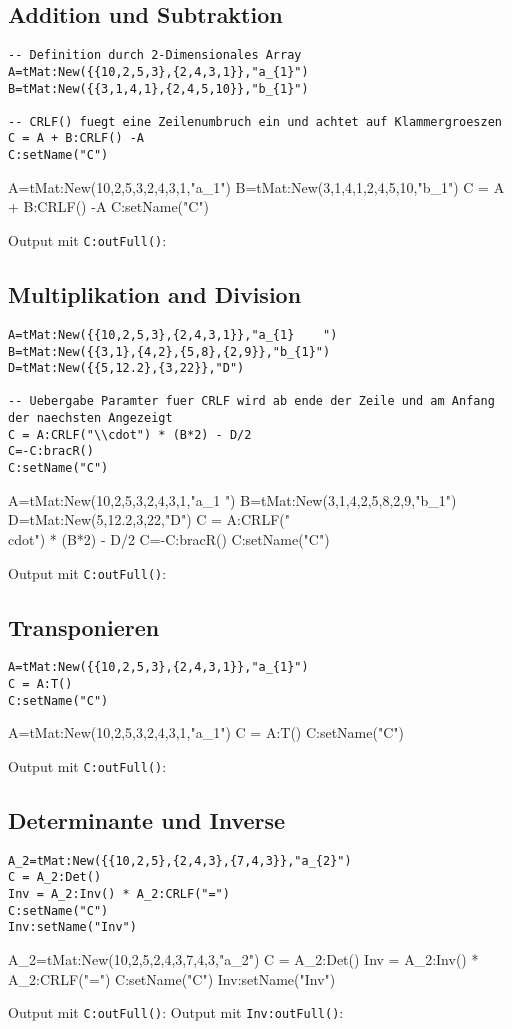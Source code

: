 \subsection{Addition und Subtraktion}
\begin{lstlisting}
-- Definition durch 2-Dimensionales Array
A=tMat:New({{10,2,5,3},{2,4,3,1}},"a_{1}")
B=tMat:New({{3,1,4,1},{2,4,5,10}},"b_{1}")

-- CRLF() fuegt eine Zeilenumbruch ein und achtet auf Klammergroeszen
C = A + B:CRLF() -A
C:setName("C")
\end{lstlisting}
\begin{luacode*}
A=tMat:New({{10,2,5,3},{2,4,3,1}},"a_{1}")
B=tMat:New({{3,1,4,1},{2,4,5,10}},"b_{1}")
C = A + B:CRLF() -A
C:setName("C")
\end{luacode*}
Output mit \lstinline{C:outFull()}:
\subsection{Multiplikation and Division}
\begin{lstlisting}
A=tMat:New({{10,2,5,3},{2,4,3,1}},"a_{1}	")
B=tMat:New({{3,1},{4,2},{5,8},{2,9}},"b_{1}")
D=tMat:New({{5,12.2},{3,22}},"D")

-- Uebergabe Paramter fuer CRLF wird ab ende der Zeile und am Anfang der naechsten Angezeigt	
C = A:CRLF("\\cdot") * (B*2) - D/2
C=-C:bracR()
C:setName("C")
\end{lstlisting}
\begin{luacode*}
A=tMat:New({{10,2,5,3},{2,4,3,1}},"a_{1}	")
B=tMat:New({{3,1},{4,2},{5,8},{2,9}},"b_{1}")
D=tMat:New({{5,12.2},{3,22}},"D")	
C = A:CRLF("\\cdot") * (B*2) - D/2
C=-C:bracR()
C:setName("C")
\end{luacode*}
Output mit \lstinline{C:outFull()}:
\subsection{Transponieren}
\begin{lstlisting}
A=tMat:New({{10,2,5,3},{2,4,3,1}},"a_{1}")
C = A:T()
C:setName("C")
\end{lstlisting}
\begin{luacode*}
A=tMat:New({{10,2,5,3},{2,4,3,1}},"a_{1}")
C = A:T()
C:setName("C")
\end{luacode*}
Output mit \lstinline{C:outFull()}:
\subsection{Determinante und Inverse}
\begin{lstlisting}
A_2=tMat:New({{10,2,5},{2,4,3},{7,4,3}},"a_{2}")
C = A_2:Det()
Inv = A_2:Inv() * A_2:CRLF("=")
C:setName("C")
Inv:setName("Inv")
\end{lstlisting}
\begin{luacode*}
A_2=tMat:New({{10,2,5},{2,4,3},{7,4,3}},"a_{2}")
C = A_2:Det()
Inv = A_2:Inv() * A_2:CRLF("=")
C:setName("C")
Inv:setName("Inv")
\end{luacode*}
Output mit \lstinline{C:outFull()}:
Output mit \lstinline{Inv:outFull()}:
